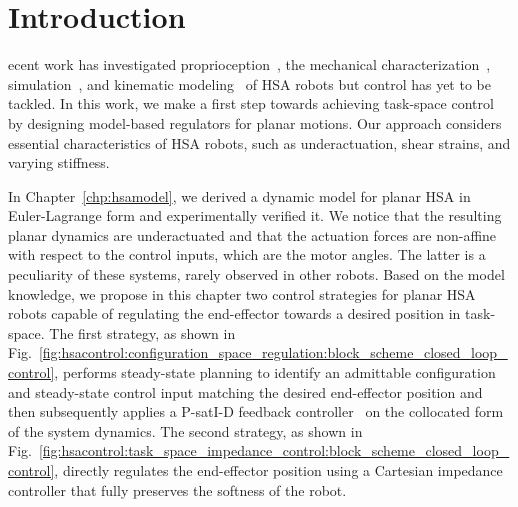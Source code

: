 \section{Introduction}
ecent work has investigated proprioception~\cite{zhang2022vision}, the mechanical characterization~\cite{good2022expanding}, simulation~\cite{stolzle2023modelling}, and kinematic modeling~\cite{garg2022kinematic, stolzle2023modelling} of \gls{HSA} robots but control has yet to be tackled.
In this work, we make a first step towards achieving task-space control by designing model-based regulators for planar motions. Our approach considers essential characteristics of \gls{HSA} robots, such as underactuation, shear strains, and varying stiffness. %

In Chapter~\ref{chp:hsamodel}, we derived a dynamic model for planar \gls{HSA} in Euler-Lagrange form and experimentally verified it.
We notice that the resulting planar dynamics are underactuated and that the actuation forces are non-affine with respect to the control inputs, which are the motor angles. The latter is a peculiarity of these systems, rarely observed in other robots.
Based on the model knowledge, we propose in this chapter two control strategies for planar \gls{HSA} robots capable of regulating the end-effector towards a desired position in task-space.
The first strategy, as shown in Fig.~\ref{fig:hsacontrol:configuration_space_regulation:block_scheme_closed_loop_control}, performs steady-state planning to identify an admittable configuration and steady-state control input matching the desired end-effector position and then subsequently applies a P-satI-D feedback controller~\cite{pustina2022p} on the collocated form~\cite{pustina2024input} of the system dynamics.
The second strategy, as shown in Fig.~\ref{fig:hsacontrol:task_space_impedance_control:block_scheme_closed_loop_control}, directly regulates the end-effector position using a Cartesian impedance controller that fully preserves the softness of the robot.

